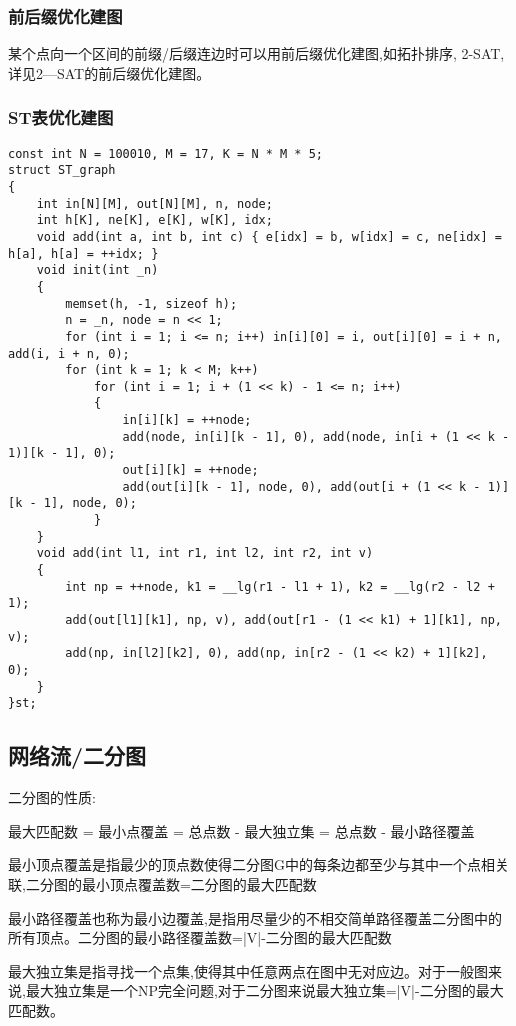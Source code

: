 \documentclass[a4paper, fontset=none]{ctexart}
\begin{document}
\subsubsection{前后缀优化建图}

某个点向一个区间的前缀/后缀连边时可以用前后缀优化建图,如拓扑排序, 2-SAT,详见2—SAT的前后缀优化建图。
\subsubsection{ST表优化建图}

\begin{verbatim}
const int N = 100010, M = 17, K = N * M * 5;
struct ST_graph
{
    int in[N][M], out[N][M], n, node;
    int h[K], ne[K], e[K], w[K], idx;
    void add(int a, int b, int c) { e[idx] = b, w[idx] = c, ne[idx] = h[a], h[a] = ++idx; }
    void init(int _n)
    {
        memset(h, -1, sizeof h);
        n = _n, node = n << 1;
        for (int i = 1; i <= n; i++) in[i][0] = i, out[i][0] = i + n, add(i, i + n, 0);
        for (int k = 1; k < M; k++)
            for (int i = 1; i + (1 << k) - 1 <= n; i++)
            {
                in[i][k] = ++node;
                add(node, in[i][k - 1], 0), add(node, in[i + (1 << k - 1)][k - 1], 0);
                out[i][k] = ++node;
                add(out[i][k - 1], node, 0), add(out[i + (1 << k - 1)][k - 1], node, 0);
            }
    }
    void add(int l1, int r1, int l2, int r2, int v)
    {
        int np = ++node, k1 = __lg(r1 - l1 + 1), k2 = __lg(r2 - l2 + 1);
        add(out[l1][k1], np, v), add(out[r1 - (1 << k1) + 1][k1], np, v);
        add(np, in[l2][k2], 0), add(np, in[r2 - (1 << k2) + 1][k2], 0);
    }
}st;
\end{verbatim}

\subsection{网络流/二分图}

二分图的性质:

最大匹配数 = 最小点覆盖 = 总点数 - 最大独立集 = 总点数 - 最小路径覆盖

最小顶点覆盖是指最少的顶点数使得二分图G中的每条边都至少与其中一个点相关联,二分图的最小顶点覆盖数=二分图的最大匹配数

最小路径覆盖也称为最小边覆盖,是指用尽量少的不相交简单路径覆盖二分图中的所有顶点。二分图的最小路径覆盖数=|V|-二分图的最大匹配数

最大独立集是指寻找一个点集,使得其中任意两点在图中无对应边。对于一般图来说,最大独立集是一个NP完全问题,对于二分图来说最大独立集=|V|-二分图的最大匹配数。
\end{document}
